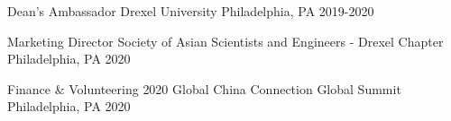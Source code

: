 

\begin{cvhonors}

  \cvhonor
  {Dean's Ambassador} %
  {Drexel University} %
  {Philadelphia, PA} %
  {2019-2020} %

  \cvhonor
  {Marketing Director} %
  {Society of Asian Scientists and Engineers - Drexel Chapter} %
  {Philadelphia, PA} %
  {2020} %

  \cvhonor
  {Finance \& Volunteering} %
  {2020 Global China Connection Global Summit} %
  {Philadelphia, PA} %
  {2020} %

\end{cvhonors}
